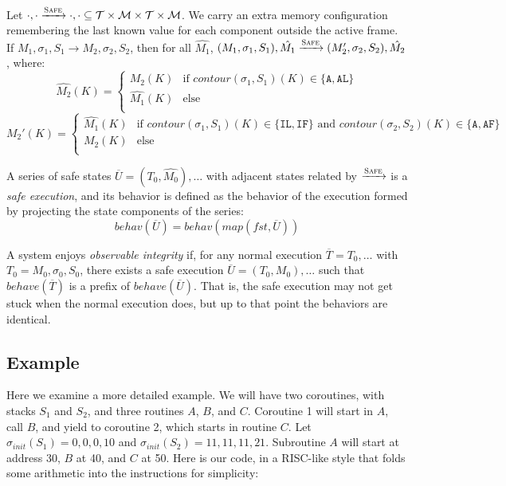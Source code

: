\documentclass{article}
\begin{document}
      Let \(\cdot,\cdot \xrightarrow{\text{\sc Safe}} \cdot,\cdot \subseteq
      \mathcal{T} \times \mathcal{M} \times \mathcal{T} \times \mathcal{M}\). We carry an
      extra memory configuration remembering the last known value for each component outside the active
      frame. If \(M_1,\sigma_1,S_1 \longrightarrow M_2,\sigma_2,S_2\), then for all \(\hat{M_1}\),
      \((M_1,\sigma_1,S_1),\hat{M_1} \xrightarrow{\text{\sc Safe}} (M_2',\sigma_2,S_2),\hat{M_2}\), where:
      \[\hat{M_2}(K) =
        \begin{cases}
          M_2(K) & \text{if } \mathit{contour}(\sigma_1,S_1)(K) \in \{\mathtt{A},\mathtt{AL}\} \\
          \hat{M_1}(K) & \text{else} \\
        \end{cases}\]
      \[M_2'(K) =
        \begin{cases}
          \hat{M_1}(K) & \text{if } \mathit{contour}(\sigma_1,S_1)(K) \in \{\mathtt{IL},\mathtt{IF}\} \text{ and }
            \mathit{contour}(\sigma_2,S_2)(K) \in \{\mathtt{A},\mathtt{AF}\} \\
          M_2(K) & \text{else} \\
        \end{cases}\]

      A series of safe states \(\overline{U} = (T_0,\hat{M_0}), \ldots\) with adjacent states related by
      \(\xrightarrow{\text{\sc Safe}}\) is a \emph{safe execution}, and its behavior is defined as the behavior
      of the execution formed by projecting the state components of the series:
      \[\mathit{behav}(\overline{U}) = \mathit{behav(map(fst,\overline{U}))}\]

      A system enjoys {\it observable integrity} if, for any normal execution \(\overline{T} = T_0,\ldots\) with
      \(T_0 = M_0,\sigma_0,S_0\), there exists a safe execution \(\overline{U} = (T_0,M_0),\ldots\) such that
      \(\mathit{behave}(\overline{T})\) is a prefix of \(\mathit{behave}(\overline{U})\). That is, the safe execution
      may not get stuck when the normal execution does, but up to that point the behaviors are identical.

  \subsection{Example}

    Here we examine a more detailed example. We will have two coroutines, with stacks \(S_1\) and \(S_2\), and
    three routines \(A\), \(B\), and \(C\). Coroutine 1 will start in \(A\), call \(B\), and yield to coroutine
    2, which starts in routine \(C\). Let \(\sigma_{init}(S_1) = 0,0,0,10\) and \(\sigma_{init}(S_2) = 11,11,11,21\).
    Subroutine \(A\) will start at address 30, \(B\) at 40, and \(C\) at 50. Here is our code, in a RISC-like style
    that folds some arithmetic into the instructions for simplicity:
\end{document}
